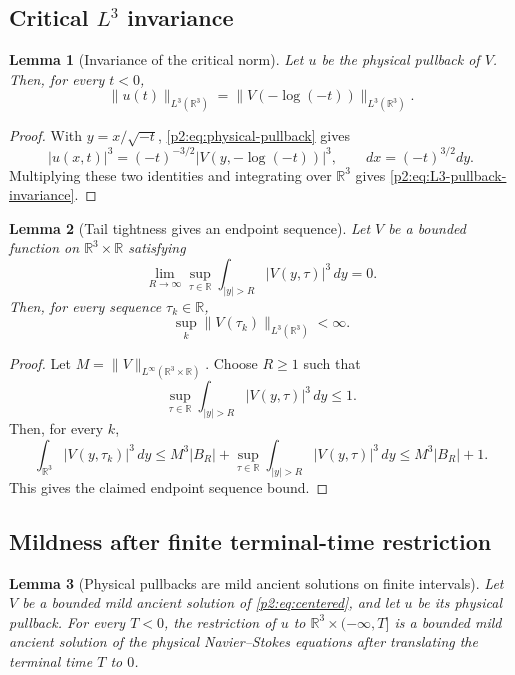 \documentclass[11pt]{amsart}
\theoremstyle{plain}
\newtheorem{lemma}[lemma]{Lemma}
\theoremstyle{definition}
\theoremstyle{remark}
\numberwithin{equation}{section}
\newcommand{\R}{\mathbb R}
\begin{document}
\subsection{\texorpdfstring{Critical \(L^3\) invariance}{Critical L3 invariance}}

\begin{lemma}[Invariance of the critical norm]
\label{p2:lem:L3-pullback-invariance}
Let \(u\) be the physical pullback of \(V\).  Then, for every \(t<0\),
\begin{equation}\label{p2:eq:L3-pullback-invariance}
   \|u(t)\|_{L^3(\R^3)}
   =
   \|V(-\log(-t))\|_{L^3(\R^3)} .
\end{equation}
\end{lemma}

\begin{proof}
With \(y=x/\sqrt{-t}\), \eqref{p2:eq:physical-pullback} gives
\[
   |u(x,t)|^3=(-t)^{-3/2}|V(y,-\log(-t))|^3,
   \qquad
   dx=(-t)^{3/2}dy .
\]
Multiplying these two identities and integrating over \(\R^3\) gives
\eqref{p2:eq:L3-pullback-invariance}.
\end{proof}

\begin{lemma}[Tail tightness gives an endpoint sequence]
\label{p2:lem:tail-tight-sequence-L3}
Let \(V\) be a bounded function on \(\R^3\times\R\) satisfying
\[
   \lim_{R\to\infty}
   \sup_{\tau\in\R}\int_{|y|>R}|V(y,\tau)|^3\,dy=0 .
\]
Then, for every sequence \(\tau_k\in\R\),
\[
   \sup_k\|V(\tau_k)\|_{L^3(\R^3)}<\infty .
\]
\end{lemma}

\begin{proof}
Let \(M=\|V\|_{L^\infty(\R^3\times\R)}\).  Choose \(R\ge1\) such that
\[
   \sup_{\tau\in\R}\int_{|y|>R}|V(y,\tau)|^3\,dy\le1 .
\]
Then, for every \(k\),
\[
   \int_{\R^3}|V(y,\tau_k)|^3\,dy
   \le M^3 |B_R|
      + \sup_{\tau\in\R}\int_{|y|>R}|V(y,\tau)|^3\,dy
   \le M^3|B_R|+1 .
\]
This gives the claimed endpoint sequence bound.
\end{proof}

\subsection{Mildness after finite terminal-time restriction}

\begin{lemma}[Physical pullbacks are mild ancient solutions on finite intervals]
\label{p2:lem:physical-mild}
Let \(V\) be a bounded mild ancient solution of \eqref{p2:eq:centered}, and let
\(u\) be its physical pullback.  For every \(T<0\), the restriction of \(u\)
to \(\R^3\times(-\infty,T]\) is a bounded mild ancient solution of the
physical Navier--Stokes equations after translating the terminal time \(T\) to
\(0\).
\end{lemma}
\end{document}
